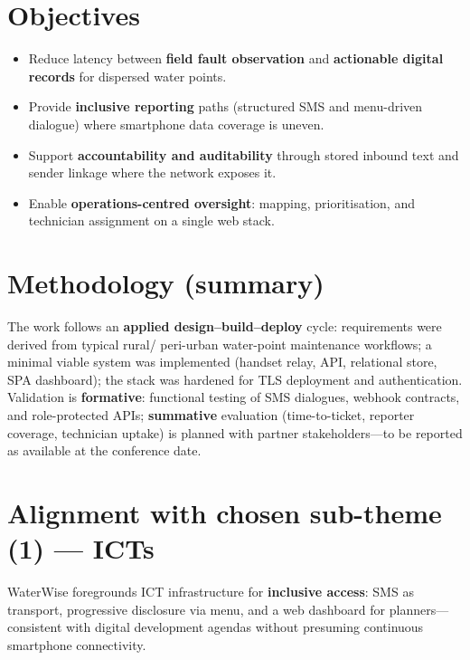 \documentclass[11pt,a4paper]{article}
\begin{document}
\section*{Objectives}
\begin{itemize}
  \item Reduce latency between \textbf{field fault observation} and \textbf{actionable digital records} for dispersed water points.
  \item Provide \textbf{inclusive reporting} paths (structured SMS and menu-driven dialogue) where smartphone data coverage is uneven.
  \item Support \textbf{accountability and auditability} through stored inbound text and sender linkage where the network exposes it.
  \item Enable \textbf{operations-centred oversight}: mapping, prioritisation, and technician assignment on a single web stack.
\end{itemize}

\section*{Methodology (summary)}
The work follows an \textbf{applied design--build--deploy} cycle: requirements were derived from typical rural/ peri-urban water-point maintenance workflows; a minimal viable system was implemented (handset relay, API, relational store, SPA dashboard); the stack was hardened for TLS deployment and authentication. Validation is \textbf{formative}: functional testing of SMS dialogues, webhook contracts, and role-protected APIs; \textbf{summative} evaluation (time-to-ticket, reporter coverage, technician uptake) is planned with partner stakeholders---to be reported as available at the conference date.

\section*{Alignment with chosen sub-theme (1) --- ICTs}
WaterWise foregrounds ICT infrastructure for \textbf{inclusive access}: SMS as transport, progressive disclosure via menu, and a web dashboard for planners---consistent with digital development agendas without presuming continuous smartphone connectivity.

\end{document}

